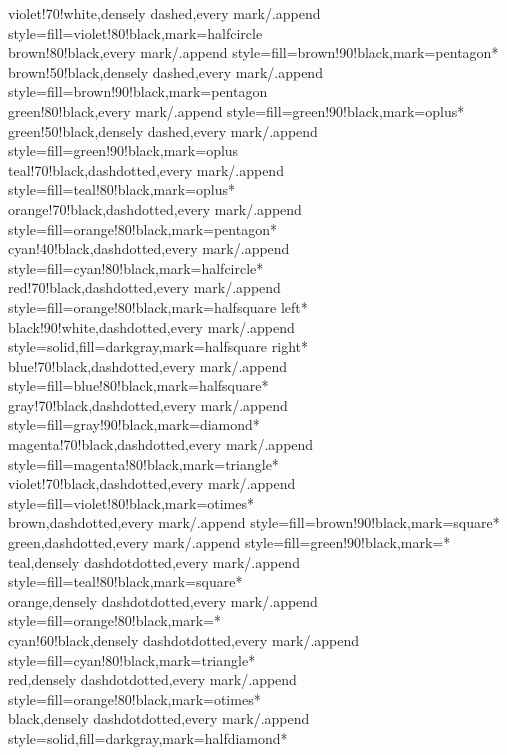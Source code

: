 \documentclass[a4paper]{article}
\begin{document}
{	violet!70!white,densely dashed,every mark/.append style={fill=violet!80!black},mark=halfcircle\\
	brown!80!black,every mark/.append style={fill=brown!90!black},mark=pentagon*\\
	brown!50!black,densely dashed,every mark/.append style={fill=brown!90!black},mark=pentagon\\
	green!80!black,every mark/.append style={fill=green!90!black},mark=oplus*\\
	green!50!black,densely dashed,every mark/.append style={fill=green!90!black},mark=oplus\\
	teal!70!black,dashdotted,every mark/.append style={fill=teal!80!black},mark=oplus*\\
	orange!70!black,dashdotted,every mark/.append style={fill=orange!80!black},mark=pentagon*\\
	cyan!40!black,dashdotted,every mark/.append style={fill=cyan!80!black},mark=halfcircle*\\
	red!70!black,dashdotted,every mark/.append style={fill=orange!80!black},mark=halfsquare left*\\
	black!90!white,dashdotted,every mark/.append style={solid,fill=darkgray},mark=halfsquare right*\\
	blue!70!black,dashdotted,every mark/.append style={fill=blue!80!black},mark=halfsquare*\\
	gray!70!black,dashdotted,every mark/.append style={fill=gray!90!black},mark=diamond*\\
	magenta!70!black,dashdotted,every mark/.append style={fill=magenta!80!black},mark=triangle*\\
	violet!70!black,dashdotted,every mark/.append style={fill=violet!80!black},mark=otimes*\\
	brown,dashdotted,every mark/.append style={fill=brown!90!black},mark=square*\\
	green,dashdotted,every mark/.append style={fill=green!90!black},mark=*\\
	teal,densely dashdotdotted,every mark/.append style={fill=teal!80!black},mark=square*\\
	orange,densely dashdotdotted,every mark/.append style={fill=orange!80!black},mark=*\\
	cyan!60!black,densely dashdotdotted,every mark/.append style={fill=cyan!80!black},mark=triangle*\\
	red,densely dashdotdotted,every mark/.append style={fill=orange!80!black},mark=otimes*\\
	black,densely dashdotdotted,every mark/.append style={solid,fill=darkgray},mark=halfdiamond*\\
}
\end{document}

